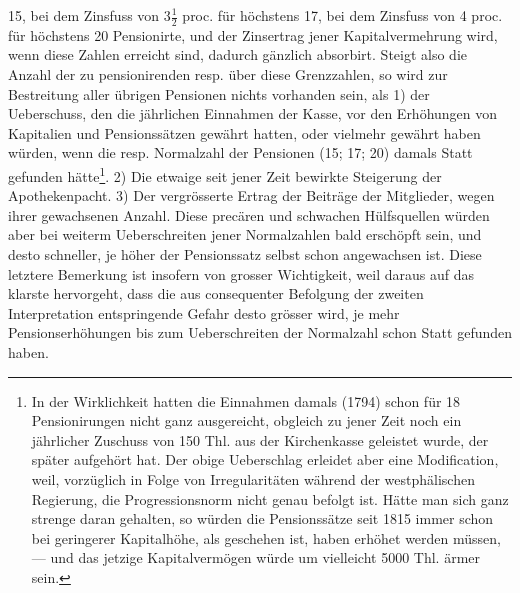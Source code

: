 15, bei dem Zinsfuss von \(3\tfrac12\) proc. für höchstens 17, bei dem Zinsfuss von 4 proc. für höchstens 20 Pensionirte, und der Zinsertrag jener Kapitalvermehrung wird, wenn diese Zahlen erreicht sind, dadurch gänzlich absorbirt. Steigt also die Anzahl der zu pensionirenden resp. über diese Grenzzahlen, so wird zur Bestreitung aller übrigen Pensionen nichts vorhanden sein, als 1) der Ueberschuss, den die jährlichen Einnahmen der Kasse, vor den Erhöhungen von Kapitalien und Pensionssätzen gewährt hatten, oder vielmehr gewährt haben würden, wenn die resp. Normalzahl der Pensionen (15; 17; 20) damals Statt gefunden hätte\footnote{In der Wirklichkeit hatten die Einnahmen damals (1794) schon für 18 Pensionirungen nicht ganz ausgereicht, obgleich zu jener Zeit noch ein jährlicher Zuschuss von 150 Thl. aus der Kirchenkasse geleistet wurde, der später aufgehört hat. Der obige Ueberschlag erleidet aber eine Modification, weil, vorzüglich in Folge von Irregularitäten während der westphälischen Regierung, die Progressionsnorm nicht genau befolgt ist. Hätte man sich ganz strenge daran gehalten, so würden die Pensionssätze seit 1815 immer schon bei geringerer Kapitalhöhe, als geschehen ist, haben erhöhet werden müssen, — und das jetzige Kapitalvermögen würde um vielleicht 5000 Thl. ärmer sein.}. 2) Die etwaige seit jener Zeit bewirkte Steigerung der Apothekenpacht. 3) Der vergrösserte Ertrag der Beiträge der Mitglieder, wegen ihrer gewachsenen Anzahl. Diese precären und schwachen Hülfsquellen würden aber bei weiterm Ueberschreiten jener Normalzahlen bald erschöpft sein, und desto schneller, je höher der Pensionssatz selbst schon angewachsen ist. Diese letztere Bemerkung ist insofern von grosser Wichtigkeit, weil daraus auf das klarste hervorgeht, dass die aus consequenter Befolgung der zweiten Interpretation entspringende Gefahr desto grösser wird, je mehr Pensionserhöhungen bis zum Ueberschreiten der Normalzahl schon Statt gefunden haben.

